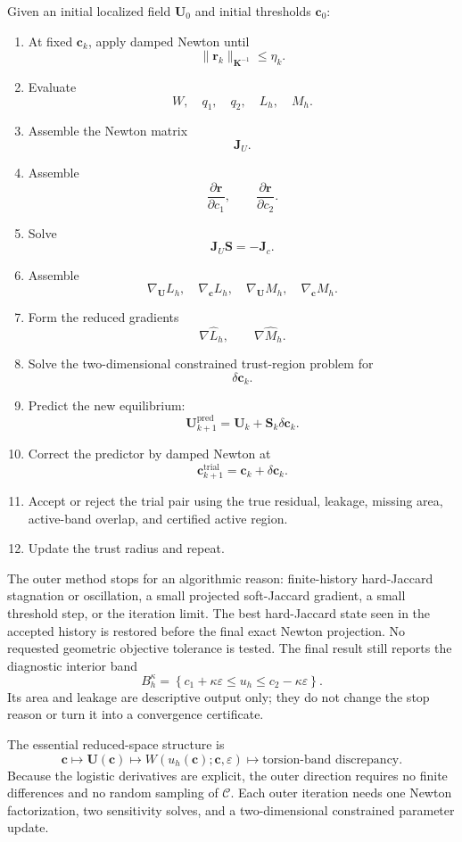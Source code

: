 \documentclass[11pt]{article}
\newcommand{\cC}{\mathcal{C}}
\newcommand{\bU}{\mathbf{U}}
\newcommand{\bc}{\mathbf{c}}
\newcommand{\br}{\mathbf{r}}
\newcommand{\bK}{\mathbf{K}}
\newcommand{\bJ}{\mathbf{J}}
\newcommand{\bS}{\mathbf{S}}
\begin{document}
Given an initial localized field $\bU_0$ and initial thresholds $\bc_0$:
\begin{enumerate}[leftmargin=2.2em]
\item At fixed $\bc_k$, apply damped Newton until
\[
\|\br_k\|_{\bK^{-1}}\leq\eta_k.
\]

\item Evaluate
\[
W,\quad q_1,\quad q_2,
\quad L_h,\quad M_h.
\]

\item Assemble the Newton matrix
\[
\bJ_U.
\]

\item Assemble
\[
\frac{\partial\br}{\partial c_1},
\qquad
\frac{\partial\br}{\partial c_2}.
\]

\item Solve
\[
\bJ_U\bS=-\bJ_c.
\]

\item Assemble
\[
\nabla_{\bU}L_h,
\quad
\nabla_{\bc}L_h,
\quad
\nabla_{\bU}M_h,
\quad
\nabla_{\bc}M_h.
\]

\item Form the reduced gradients
\[
\nabla\widehat L_h,
\qquad
\nabla\widehat M_h.
\]

\item Solve the two-dimensional constrained trust-region problem for
\[
\delta\bc_k.
\]

\item Predict the new equilibrium:
\[
\bU_{k+1}^{\mathrm{pred}}
=
\bU_k+\bS_k\delta\bc_k.
\]

\item Correct the predictor by damped Newton at
\[
\bc_{k+1}^{\mathrm{trial}}
=
\bc_k+\delta\bc_k.
\]

\item Accept or reject the trial pair using the true residual, leakage, missing area, active-band overlap, and certified active region.

\item Update the trust radius and repeat.
\end{enumerate}
The outer method stops for an algorithmic reason: finite-history hard-Jaccard
stagnation or oscillation, a small projected soft-Jaccard gradient, a small
threshold step, or the iteration limit.  The best hard-Jaccard state seen in
the accepted history is restored before the final exact Newton projection.
No requested geometric objective tolerance is tested.  The final result still
reports the diagnostic interior band
\[
B_h^\kappa
=
\left\{
c_1+\kappa\varepsilon
\leq u_h
\leq
c_2-\kappa\varepsilon
\right\}.
\]
Its area and leakage are descriptive output only; they do not change the stop
reason or turn it into a convergence certificate.

The essential reduced-space structure is
\[
\boxed{
\bc
\longmapsto
\bU(\bc)
\longmapsto
W(u_h(\bc);\bc,\varepsilon)
\longmapsto
\text{torsion-band discrepancy}.
}
\]
Because the logistic derivatives are explicit, the outer direction requires no finite differences and no random sampling of $\cC$. Each outer iteration needs one Newton factorization, two sensitivity solves, and a two-dimensional constrained parameter update.
\end{document}
